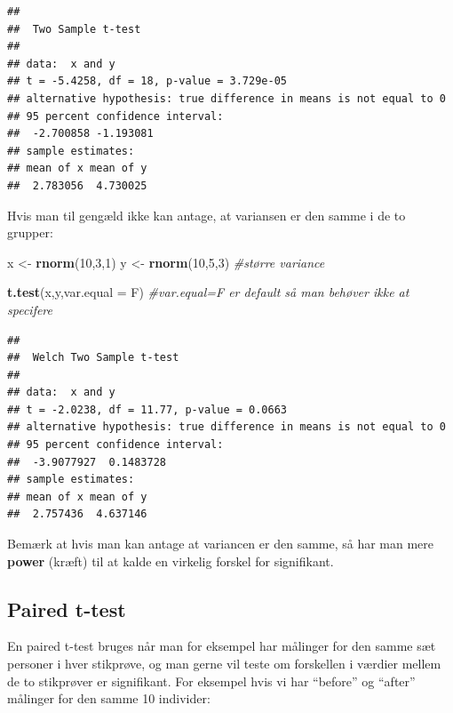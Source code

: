 \documentclass[
]{book}
\newenvironment{Shaded}{\begin{snugshade}}{\end{snugshade}}
\newcommand{\AttributeTok}[1]{\textcolor[rgb]{0.13,0.29,0.53}{#1}}
\newcommand{\CommentTok}[1]{\textcolor[rgb]{0.56,0.35,0.01}{\textit{#1}}}
\newcommand{\DecValTok}[1]{\textcolor[rgb]{0.00,0.00,0.81}{#1}}
\newcommand{\FunctionTok}[1]{\textcolor[rgb]{0.13,0.29,0.53}{\textbf{#1}}}
\newcommand{\NormalTok}[1]{#1}
\newcommand{\OtherTok}[1]{\textcolor[rgb]{0.56,0.35,0.01}{#1}}
\theoremstyle{definition}
\theoremstyle{definition}
\theoremstyle{definition}
\theoremstyle{definition}
\theoremstyle{remark}
\begin{document}
\begin{verbatim}
## 
##  Two Sample t-test
## 
## data:  x and y
## t = -5.4258, df = 18, p-value = 3.729e-05
## alternative hypothesis: true difference in means is not equal to 0
## 95 percent confidence interval:
##  -2.700858 -1.193081
## sample estimates:
## mean of x mean of y 
##  2.783056  4.730025
\end{verbatim}

Hvis man til gengæld ikke kan antage, at variansen er den samme i de to grupper:

\begin{Shaded}
\begin{Highlighting}[]
\NormalTok{x }\OtherTok{\textless{}{-}} \FunctionTok{rnorm}\NormalTok{(}\DecValTok{10}\NormalTok{,}\DecValTok{3}\NormalTok{,}\DecValTok{1}\NormalTok{)}
\NormalTok{y }\OtherTok{\textless{}{-}} \FunctionTok{rnorm}\NormalTok{(}\DecValTok{10}\NormalTok{,}\DecValTok{5}\NormalTok{,}\DecValTok{3}\NormalTok{) }\CommentTok{\#større variance}

\FunctionTok{t.test}\NormalTok{(x,y,}\AttributeTok{var.equal =}\NormalTok{ F) }\CommentTok{\#var.equal=F er \textquotesingle{}default\textquotesingle{} så man behøver ikke at specifere}
\end{Highlighting}
\end{Shaded}

\begin{verbatim}
## 
##  Welch Two Sample t-test
## 
## data:  x and y
## t = -2.0238, df = 11.77, p-value = 0.0663
## alternative hypothesis: true difference in means is not equal to 0
## 95 percent confidence interval:
##  -3.9077927  0.1483728
## sample estimates:
## mean of x mean of y 
##  2.757436  4.637146
\end{verbatim}

Bemærk at hvis man kan antage at variancen er den samme, så har man mere \textbf{power} (kræft) til at kalde en virkelig forskel for signifikant.

\subsection{Paired t-test}\label{paired-t-test}

En paired t-test bruges når man for eksempel har målinger for den samme sæt personer i hver stikprøve, og man gerne vil teste om forskellen i værdier mellem de to stikprøver er signifikant. For eksempel hvis vi har ``before'' og ``after'' målinger for den samme 10 individer:
\end{document}
